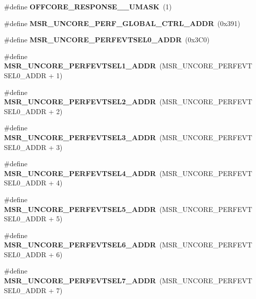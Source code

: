 \begin{DoxyCompactItemize}
\#define {\bfseries O\+F\+F\+C\+O\+R\+E\+\_\+\+R\+E\+S\+P\+O\+N\+S\+E\+\_\+\_\+\+U\+M\+A\+SK}~(1)
\item 
\mbox{\label{types_8h_af3f19ae0e002a60fd6546e040b0c5159}} 
\#define {\bfseries M\+S\+R\+\_\+\+U\+N\+C\+O\+R\+E\+\_\+\+P\+E\+R\+F\+\_\+\+G\+L\+O\+B\+A\+L\+\_\+\+C\+T\+R\+L\+\_\+\+A\+D\+DR}~(0x391)
\item 
\mbox{\label{types_8h_a7e48eb341897b28179bcaa5b70b3c552}} 
\#define {\bfseries M\+S\+R\+\_\+\+U\+N\+C\+O\+R\+E\+\_\+\+P\+E\+R\+F\+E\+V\+T\+S\+E\+L0\+\_\+\+A\+D\+DR}~(0x3\+C0)
\item 
\mbox{\label{types_8h_aa5b503ab3f1be74c238ee87df2227c32}} 
\#define {\bfseries M\+S\+R\+\_\+\+U\+N\+C\+O\+R\+E\+\_\+\+P\+E\+R\+F\+E\+V\+T\+S\+E\+L1\+\_\+\+A\+D\+DR}~(M\+S\+R\+\_\+\+U\+N\+C\+O\+R\+E\+\_\+\+P\+E\+R\+F\+E\+V\+T\+S\+E\+L0\+\_\+\+A\+D\+DR + 1)
\item 
\mbox{\label{types_8h_a0e259eb9e97c5a62f776c2d55cd5dede}} 
\#define {\bfseries M\+S\+R\+\_\+\+U\+N\+C\+O\+R\+E\+\_\+\+P\+E\+R\+F\+E\+V\+T\+S\+E\+L2\+\_\+\+A\+D\+DR}~(M\+S\+R\+\_\+\+U\+N\+C\+O\+R\+E\+\_\+\+P\+E\+R\+F\+E\+V\+T\+S\+E\+L0\+\_\+\+A\+D\+DR + 2)
\item 
\mbox{\label{types_8h_a61a090a6079a203a639a1c7c7310e1bd}} 
\#define {\bfseries M\+S\+R\+\_\+\+U\+N\+C\+O\+R\+E\+\_\+\+P\+E\+R\+F\+E\+V\+T\+S\+E\+L3\+\_\+\+A\+D\+DR}~(M\+S\+R\+\_\+\+U\+N\+C\+O\+R\+E\+\_\+\+P\+E\+R\+F\+E\+V\+T\+S\+E\+L0\+\_\+\+A\+D\+DR + 3)
\item 
\mbox{\label{types_8h_a010d49776b25ca977779192d242b9967}} 
\#define {\bfseries M\+S\+R\+\_\+\+U\+N\+C\+O\+R\+E\+\_\+\+P\+E\+R\+F\+E\+V\+T\+S\+E\+L4\+\_\+\+A\+D\+DR}~(M\+S\+R\+\_\+\+U\+N\+C\+O\+R\+E\+\_\+\+P\+E\+R\+F\+E\+V\+T\+S\+E\+L0\+\_\+\+A\+D\+DR + 4)
\item 
\mbox{\label{types_8h_a3f2bdd1896753976342846df2df2b67b}} 
\#define {\bfseries M\+S\+R\+\_\+\+U\+N\+C\+O\+R\+E\+\_\+\+P\+E\+R\+F\+E\+V\+T\+S\+E\+L5\+\_\+\+A\+D\+DR}~(M\+S\+R\+\_\+\+U\+N\+C\+O\+R\+E\+\_\+\+P\+E\+R\+F\+E\+V\+T\+S\+E\+L0\+\_\+\+A\+D\+DR + 5)
\item 
\mbox{\label{types_8h_ae6571d558e765af67f21ce688a5530e9}} 
\#define {\bfseries M\+S\+R\+\_\+\+U\+N\+C\+O\+R\+E\+\_\+\+P\+E\+R\+F\+E\+V\+T\+S\+E\+L6\+\_\+\+A\+D\+DR}~(M\+S\+R\+\_\+\+U\+N\+C\+O\+R\+E\+\_\+\+P\+E\+R\+F\+E\+V\+T\+S\+E\+L0\+\_\+\+A\+D\+DR + 6)
\item 
\mbox{\label{types_8h_aeda0600911ff4baeeaeeb3c36540a508}} 
\#define {\bfseries M\+S\+R\+\_\+\+U\+N\+C\+O\+R\+E\+\_\+\+P\+E\+R\+F\+E\+V\+T\+S\+E\+L7\+\_\+\+A\+D\+DR}~(M\+S\+R\+\_\+\+U\+N\+C\+O\+R\+E\+\_\+\+P\+E\+R\+F\+E\+V\+T\+S\+E\+L0\+\_\+\+A\+D\+DR + 7)

\end{DoxyCompactItemize}
